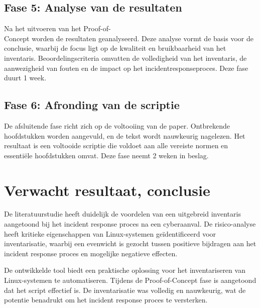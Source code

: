 \subsection{Fase 5: Analyse van de resultaten}%
\label{sub:analyse_van_de_resultaten}

Na het uitvoeren van het Proof-of-\\Concept worden de resultaten geanalyseerd.
Deze analyse vormt de basis voor de conclusie, waarbij de focus ligt op de kwaliteit en bruikbaarheid van het inventaris.
Beoordelingscriteria omvatten de volledigheid van het inventaris, de aanwezigheid van fouten en de impact op het incidentresponseproces.
Deze fase duurt 1 week.

\subsection{Fase 6: Afronding van de scriptie}%
\label{sub:afronding_van_de_scriptie}

De afsluitende fase richt zich op de voltooiing van de paper.
Ontbrekende hoofdstukken worden aangevuld, en de tekst wordt nauwkeurig nagelezen.
Het resultaat is een voltooide scriptie die voldoet aan alle vereiste normen en essenti\"ele hoofdstukken omvat.
Deze fase neemt 2 weken in beslag.

\section{Verwacht resultaat, conclusie}%
\label{sec:verwachte_resultaten}

De literatuurstudie heeft duidelijk de voordelen van een uitgebreid inventaris aangetoond bij het incident response proces na een cyberaanval.
De risico-analyse heeft kritieke eigenschappen van Linux-systemen ge\"identificeerd voor inventarisatie, waarbij een evenwicht is gezocht tussen positieve bijdragen aan het incident response proces en mogelijke negatieve effecten.

De ontwikkelde tool biedt een praktische oplossing voor het inventariseren van Linux-systemen te automatiseren.
Tijdens de Proof-of-Concept fase is aangetoond dat het script effectief is.
De inventarisatie was volledig en nauwkeurig, wat de potentie benadrukt om het incident response proces te versterken.

